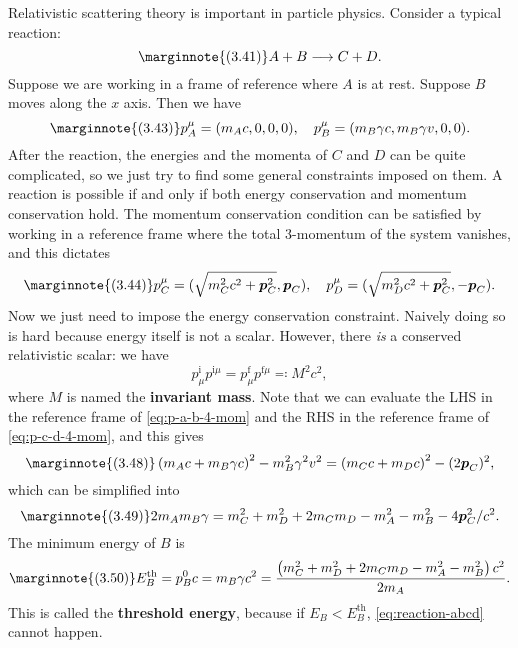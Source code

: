 \documentclass[hyperref, a4paper]{article}
\newcommand*{\concept}[1]{{\textbf{#1}}}
\begin{document}
Relativistic scattering theory is important in particle physics. Consider a typical reaction:
\begin{equation} \marginnote{(3.41)}
    A + B \longrightarrow C + D.
    \label{eq:reaction-abcd}
\end{equation}
Suppose we are working in a frame of reference where $A$ is at rest. Suppose $B$ moves along the $x$ axis.
Then we have 
\begin{equation} \marginnote{(3.43)}
    p_A^\mu = (m_A c, 0, 0, 0), \quad p_B^\mu = (m_B \gamma c, m_B \gamma v, 0, 0).
    \label{eq:p-a-b-4-mom}
\end{equation}
After the reaction, the energies and the momenta of $C$ and $D$ can be quite complicated, so we just 
try to find some general constraints imposed on them. A reaction is possible if and only if both 
energy conservation and momentum conservation hold. The momentum conservation condition can be 
satisfied by working in a reference frame where the total 3-momentum of the system vanishes, and 
this dictates 
\begin{equation} \marginnote{(3.44)}
    p_C^\mu = (\sqrt{m_C^2 c^2 + \vb*{p}_C^2}, \vb*{p}_C), \quad p_D^\mu = (\sqrt{m_D^2 c^2 + \vb*{p}_C^2}, - \vb*{p}_C).
    \label{eq:p-c-d-4-mom}
\end{equation}
Now we just need to impose the energy conservation constraint. Naively doing so is hard because energy itself 
is not a scalar. However, there \emph{is} a conserved relativistic scalar: we have  
\begin{equation}
    p^\text{i}_\mu p^{\text{i} \mu} = p^\text{f}_\mu p^{\text{f} \mu} \eqqcolon M^2 c^2,
\end{equation}
where $M$ is named the \concept{invariant mass}. Note that we can evaluate the LHS in the reference frame of 
\eqref{eq:p-a-b-4-mom} and the RHS in the reference frame of \eqref{eq:p-c-d-4-mom}, and this gives 
\begin{equation} \marginnote{(3.48)}
    \left(m_{A} c+m_{B} \gamma c\right)^{2}-m_{B}^{2} \gamma^{2} v^{2}=\left(m_{C} c+m_{D} c\right)^{2} - (2 \vb*{p}_C)^2,
\end{equation}
which can be simplified into 
\begin{equation} \marginnote{(3.49)}
    2 m_{A} m_{B} \gamma=m_{C}^{2}+m_{D}^{2}+2 m_{C} m_{D}-m_{A}^{2}-m_{B}^{2} - 4 \vb*{p}_C^2 / c^2.
\end{equation}
The minimum energy of $B$ is 
\begin{equation} \marginnote{(3.50)}
    E_B^\text{th} = p_B^0 c = m_B \gamma c^2 = \frac{\left(m_{C}^{2}+m_{D}^{2}+2 m_{C} m_{D}-m_{A}^{2}-m_{B}^{2}\right) c^{2}}{2 m_{A}}.
\end{equation}
This is called the \concept{threshold energy}, because if $E_B < E_B^\text{th}$, \eqref{eq:reaction-abcd} cannot happen.
\end{document}
